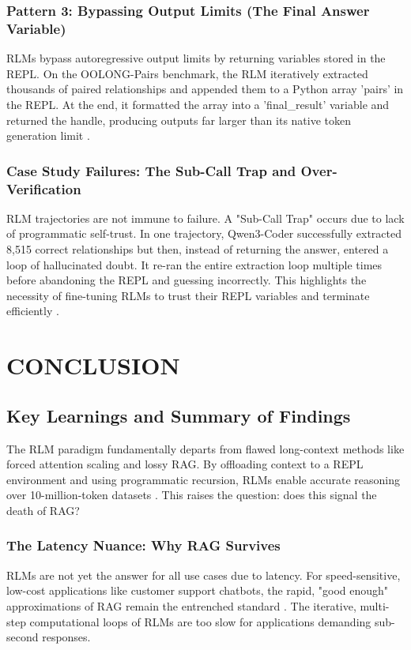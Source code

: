 \subsection{Pattern 3: Bypassing Output Limits (The Final Answer Variable)}
RLMs bypass autoregressive output limits by returning variables stored in the REPL. On the OOLONG-Pairs benchmark, the RLM iteratively extracted thousands of paired relationships and appended them to a Python array 'pairs' in the REPL. At the end, it formatted the array into a 'final\_result' variable and returned the handle, producing outputs far larger than its native token generation limit \cite{packer2024}.

\subsection{Case Study Failures: The Sub-Call Trap and Over-Verification}
RLM trajectories are not immune to failure. A "Sub-Call Trap" occurs due to lack of programmatic self-trust. In one trajectory, Qwen3-Coder successfully extracted 8,515 correct relationships but then, instead of returning the answer, entered a loop of hallucinated doubt. It re-ran the entire extraction loop multiple times before abandoning the REPL and guessing incorrectly. This highlights the necessity of fine-tuning RLMs to trust their REPL variables and terminate efficiently \cite{deepseek2025}.



\chapter{CONCLUSION}


\section{Key Learnings and Summary of Findings}
The RLM paradigm fundamentally departs from flawed long-context methods like forced attention scaling and lossy RAG. By offloading context to a REPL environment and using programmatic recursion, RLMs enable accurate reasoning over 10-million-token datasets \cite{zhang2025}. This raises the question: does this signal the death of RAG?

\subsection{The Latency Nuance: Why RAG Survives}
RLMs are not yet the answer for all use cases due to latency. For speed-sensitive, low-cost applications like customer support chatbots, the rapid, "good enough" approximations of RAG remain the entrenched standard \cite{lewis2020}. The iterative, multi-step computational loops of RLMs are too slow for applications demanding sub-second responses.



